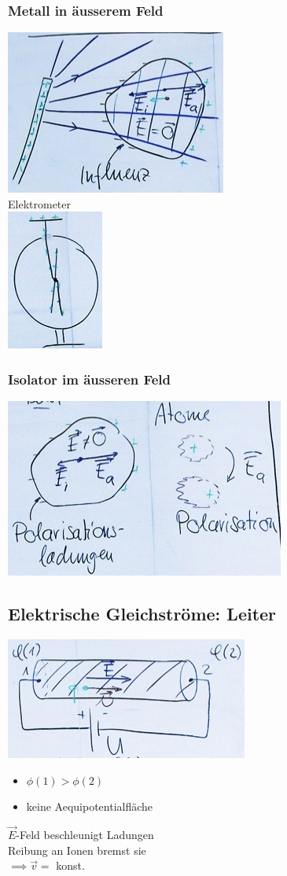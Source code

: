 \subsubsection{Metall in äusserem Feld}
\includegraphics{Bild168} \\
Elektrometer \\
\includegraphics{Bild169}

\subsubsection{Isolator im äusseren Feld}
\includegraphics{Bild170}

\subsection{Elektrische Gleichströme: Leiter}
\includegraphics{Bild171} \\
\begin{itemize}[ label = $\implies$ ]
	\item $\phi(1) > \phi(2)$
	\item keine Aequipotentialfläche
\end{itemize}
$\vec{E}$-Feld beschleunigt Ladungen \\
Reibung an Ionen bremst sie \\
$\implies \vec{v} =$ konst.













